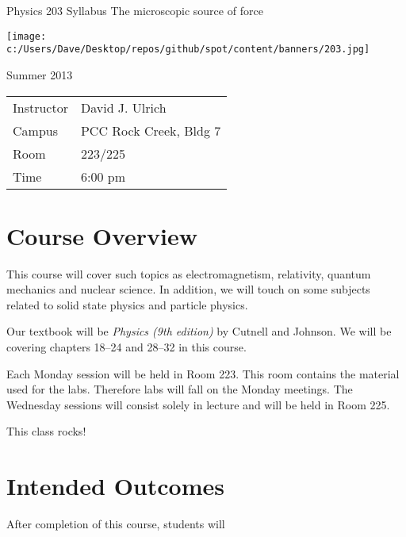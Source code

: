 \documentclass{article}
\begin{document}
\begin{center}
{\LARGE Physics 203 Syllabus}
\vskip 0.25cm
{\large The microscopic source of force}

\vskip 0.25cm
\texttt{[image: c:/Users/Dave/Desktop/repos/github/spot/content/banners/203.jpg]}

\vskip 0.25cm
{\large Summer 2013}
\end{center}

\begin{center}
\renewcommand{\arraystretch}{1.5}
\renewcommand{\tabcolsep}{0.2cm}
\begin{tabular}{ll}
\hline
Instructor & David J. Ulrich \\




Campus & PCC Rock Creek, Bldg 7 \\ 
Room & 223/225 \\ 
Time & 6:00 pm \\ 
\hline
\end{tabular}
\end{center}

\section{Course Overview}

%
This course will cover such topics as electromagnetism, relativity, quantum mechanics and nuclear science.
%
In addition, we will touch on some subjects related to solid state physics and particle physics.
%
%

%
Our textbook will be \emph{Physics (9th edition)} by Cutnell and Johnson.
%
We will be covering chapters 18--24 and 28--32 in this course.
%
%

Each Monday session will be held in Room 223. This room contains the material used for the labs. Therefore labs will fall on the Monday meetings. The Wednesday sessions will consist solely in lecture and will be held in Room 225.

This class rocks!



\section{Intended Outcomes}

After completion of this course, students will
\end{document}
